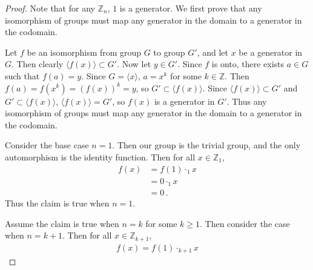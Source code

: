 \documentclass{abrice}
\newcommand{\Z}{\mathbb{Z}}
\begin{document}
\begin{proof}
  Note that for any $\Z_n$, $1$ is a generator. We first prove that any
  isomorphism of groups must map any generator in the domain to a generator in the
  codomain.

  Let $f$ be an isomorphism from group $G$ to group $G'$, and let $x$ be a
  generator in $G$. Then clearly $\langle f(x) \rangle \subset G'$. Now let $y
  \in G'$. Since $f$ is onto, there exists $a \in G$ such that $f(a) = y$. Since
  $G = \langle x \rangle$, $a = x^k$ for some $k \in \Z$. Then $f(a) = f(x^k) =
  {(f(x))}^k = y$, so $G' \subset \langle f(x) \rangle$. Since $\langle f(x)
  \rangle \subset G'$ and $G' \subset \langle f(x) \rangle$, $\langle f(x)
  \rangle = G'$, so $f(x)$ is a generator in $G'$. Thus any isomorphism of
  groups must map any generator in the domain to a generator in the codomain.

  Consider the base case $n = 1$. Then our group is the trivial group, and the
  only automorphism is the identity function. Then for all $x \in \Z_1$,
  \begin{align*}
    f(x)
    &= f(1) \cdot_1 x \\
    &= 0 \cdot_1 x \\
    &= 0\, .
  \end{align*}
  Thus the claim is true when $n = 1$.

  Assume the claim is true when $n = k$ for some $k \geq 1$. Then consider the
  case when $n = k + 1$. Then for all $x \in \Z_{k+1}$,
  \begin{align*}
    f(x) = f(1) \cdot_{k+1} x
  \end{align*}
\end{proof}
\end{document}
